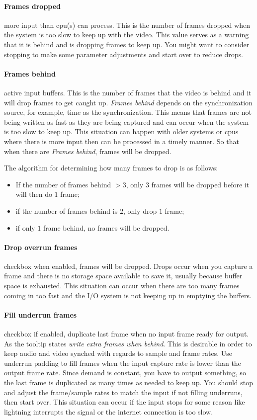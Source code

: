 \paragraph{Frames dropped} more input than cpu(s) can process.  This is the number of frames dropped when the system is too slow to keep up with the video.  This value serves as a warning that it is behind and is dropping frames to keep up.  You might want to consider stopping to make some parameter adjustments and start over to reduce drops.
\paragraph{Frames behind} active input buffers.  This is the number of frames that the video is behind and it will drop frames to get caught up.  \textit{Frames behind} depends on the synchronization source, for example, time as the synchronization.  This means that frames are not being written as fast as they are being captured and can occur when the system is too slow to keep up.  This situation can happen with older systems or cpus where there is more input then can be processed in a timely manner.  So that when there are \textit{Frames behind}, frames will be dropped.

The algorithm for determining how many frames to drop is as follows:

\begin{itemize}
    \item If the number of frames behind $> 3$, only $3$ frames will be dropped before it will then do $1$ frame;
    \item if the number of frames behind is $2$, only drop $1$ frame;
    \item if only $1$ frame behind, no frames will be dropped.
\end{itemize}
\paragraph{Drop overrun frames} checkbox when enabled, frames will be dropped.  Drops occur when you capture a frame and there is no storage space available to save it, usually because buffer space is exhausted.  This situation can occur when there are too many frames coming in too fast and the I/O system is not keeping up in emptying the buffers.
\paragraph{Fill underrun frames} checkbox if enabled, duplicate last frame when no input frame ready for output.  As the tooltip states \textit{write extra frames when behind}. This is desirable in order to keep audio and video synched with regards to sample and frame rates.  Use underrun padding to fill frames when the input capture rate is lower than the output frame rate.  Since demand is constant, you have to output something, so the last frame is duplicated as many times as needed to keep up.  You should stop and adjust the frame/sample rates to match the input if not filling underruns, then start over.  This situation can occur if the input stops for some reason like lightning interrupts the signal or the internet connection is too slow.
